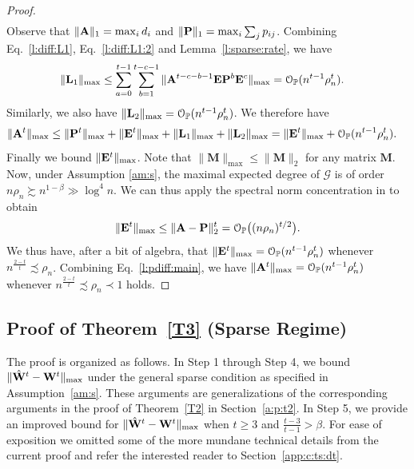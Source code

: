 \documentclass[10pt,journal,compsoc]{IEEEtran}
\newcommand{\op}{\mathcal{O}_{\mathbb{P}}}
\newcommand{\ee}{\end{aligned} \end{equation}}
\newcommand{\bee}{\begin{equation}\begin{aligned}}
\newcommand{\M}[1]{{{\mathbf{\MakeUppercase{#1}}}}}
\numberwithin{equation}{section}
\begin{document}
\begin{proof}
\begin{equation}
\begin{split}
\end{split}
\end{equation}
Observe that $\|\M A\|_{1} = \max_{i} d_i$ and $\|\M 
P\|_{1} = \max_{i} \sum_{j} p_{ij}$. Combining Eq.~\eqref{l:diff:L1}, Eq.~\eqref{l:diff:L1:2} and
Lemma~\ref{l:sparse:rate}, we have
\bee\nonumber
\|\M L_1\|_{\max} &\leq \sum_{a = 0}^{t - 1}\sum_{b = 1}^{t - c - 1} \|\M A^{t - c - b - 1} \M E \M P^{b} \M E^c\|_{\max}
= \op(n^{t - 1}\rho_n^{t}).
\ee
Similarly, we also have $\|\M L_2\|_{\max} = \op(n^{t -
  1}\rho_n^{t})$. We therefore have
\bee\label{l:pdiff:main}
\|\M A^{t}\|_{\max} &\leq  %
\|\M P^t\|_{\max} + \|\M E^{t}\|_{\max} + \|\M L_1\|_{\max} + \|\M L_2\|_{\max}
= \|\M E^{t}\|_{\max} + \op(n^{t - 1}\rho_n^{t}).
\ee
Finally we bound $\|\M E^t\|_{\max}$. Note that $\|\mathbf{M}\|_{\max}\leq \|\mathbf{M}\|_2$ 
for any matrix $\mathbf{M}$. 
Now, under Assumption \ref{am:s}, the maximal expected degree of
$\mathcal{G}$ is of order $n\rho_n\succsim n^{1 -
  \beta}\gg\log^4n$. We can thus apply the spectral norm concentration in \cite{lu2013spectra} to obtain
\bee\label{lupeng}
\|\M E^{t}\|_{\mathrm{max}} \leq \|\M A - \M P\|_{2}^{t} = \mathcal{O}_{\mathbb{P}}\bigl((n\rho_n)^{t/2}\bigr).
\ee
We thus have, after a bit of algebra, that $\|\M E^{t}\|_{\max} = \op(n^{t - 1}\rho_n^t)$ whenever $n^{\frac{2 - t }{t}}\precsim \rho_n$. Combining Eq.~\eqref{l:pdiff:main}, we have $\|\M A^t\|_{\max} = \op(n^{t - 1}\rho_n^t)$ whenever $n^{\frac{2-t}{t}}\precsim \rho_n\prec 1$ holds.
\end{proof}
\subsection{Proof of Theorem~\ref{T3} (Sparse Regime) 
}\label{sec:pf:ts:main}
The proof is organized as follows. In {Step 1} through {Step 4},
we bound $\|\hat{\M W}^t - \M W^t\|_{\max}$ under the
general sparse condition as specified in Assumption~\ref{am:s}. These
arguments are generalizations of the corresponding arguments in the proof
of Theorem~\ref{T2} in Section~\ref{a:p:t2}.
In {Step 5}, we provide an improved bound for $\|\hat{\M W}^t
- \M W^t\|_{\max}$ when $t \geq 3$ and $\tfrac{t-3}{t-1} > \beta$. For ease of exposition we omitted some of the more mundane technical details
from the current proof and refer the interested reader to Section~\ref{app:c:ts:dt}.
\end{document}

